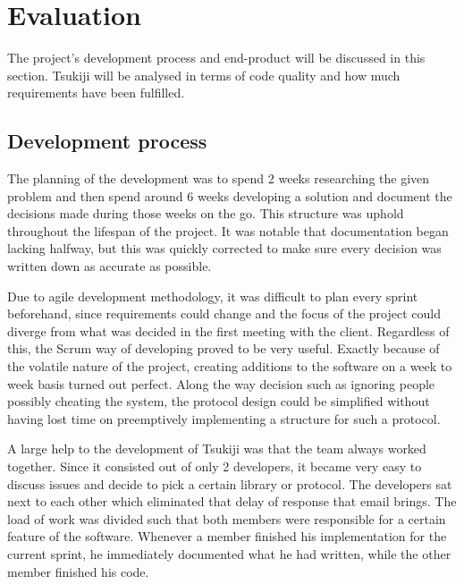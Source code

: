 \section{Evaluation}
\label{evaluation}
The project's development process and end-product will be discussed in this section.
Tsukiji will be analysed in terms of code quality and how much requirements have been fulfilled.

\subsection{Development process}
The planning of the development was to spend 2 weeks researching the given problem and then spend around 6 weeks developing a solution and document the decisions made during those weeks on the go.
This structure was uphold throughout the lifespan of the project.
It was notable that documentation began lacking halfway, but this was quickly corrected to make sure every decision was written down as accurate as possible.

Due to agile development methodology, it was difficult to plan every sprint beforehand, since requirements could change and the focus of the project could diverge from what was decided in the first meeting with the client.
Regardless of this, the Scrum way of developing proved to be very useful.
Exactly because of the volatile nature of the project, creating additions to the software on a week to week basis turned out perfect. 
Along the way decision such as ignoring people possibly cheating the system, the protocol design could be simplified without having lost time on preemptively implementing a structure for such a protocol.

A large help to the development of Tsukiji was that the team always worked together. 
Since it consisted out of only 2 developers, it became very easy to discuss issues and decide to pick a certain library or protocol.
The developers sat next to each other which eliminated that delay of response that email brings. 
The load of work was divided such that both members were responsible for a certain feature of the software.
Whenever a member finished his implementation for the current sprint, he immediately documented what he had written, while the other member finished his code.

